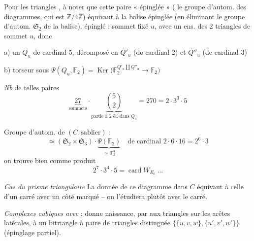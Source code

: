 \documentclass[11pt,a4paper]{article}
\begin{document}


Pour les  triangles
, 
à noter que cette paire « épinglée » ( 
le groupe d'autom. des diagrammes, qui est $\mathbb{Z}/4\mathbb{Z}$)
équivaut à la balise épinglée (en éliminant le groupe d'autom.
$\mathfrak{S}_2$ de la balise). 
 épinglé : sommet fixé $u$, avec un ens.
des 2 triangles de sommet $u$, donc

a) un $Q_u$ de cardinal 5, décomposé en $Q'_u$ (de cardinal 2) et
$Q''_u$ (de cardinal 3)

b) torseur sous
$\Psi(Q_u, \mathbb{F}_2) = \operatorname{Ker}\bigl(\mathbb{F}_2^{Q'_u \amalg Q''_u} \to \mathbb{F}_2\bigr)$

\emph{Nb} de telles paires
\[
\underbrace{27}_{\text{sommets}} \cdot \underbrace{\binom{5}{2}}_{\text{partie à 2 él. dans } Q_u} = 270 = 2 \cdot 3^{3} \cdot 5
\]

Groupe d'autom. de $(C, \text{sablier})$ :
\[
\simeq (\mathfrak{S}_2 \times \mathfrak{S}_3) \cdot \underbrace{\Psi(\mathbb{F}_2)}_{\simeq\, \mathbb{F}_2^{4}}
\quad \text{de cardinal } 2 \cdot 6 \cdot 16 = 2^{6} \cdot 3
\]
on trouve bien comme produit
\[
2^{7} \cdot 3^{4} \cdot 5 = \operatorname{card} W_{E_6} \ \ldots
\]


\emph{Cas du prisme triangulaire} 
La donnée de ce diagramme dans $C$ équivaut à celle d'un carré avec un côté
marqué -- on l'étudiera plutôt avec le carré.

\emph{Complexes cubiques avec } :
\emph{}    donne
naissance, par  aux triangles sur les arêtes latérales,
à un bitriangle à paire de triangles  distinguée
$\lbrace\lbrace u, v, w \rbrace, \lbrace u', v', w' \rbrace\rbrace$
(épinglage partiel).
\end{document}
